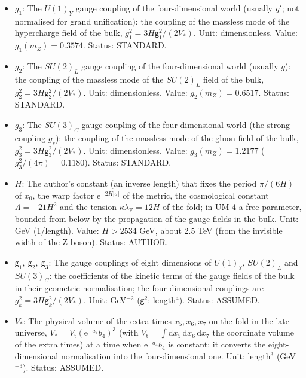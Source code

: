 \documentclass[
  10pt,
]{article}
\providecommand{\tightlist}{%
  \setlength{\itemsep}{0pt}\setlength{\parskip}{0pt}}
\begin{document}
\begin{itemize}
\tightlist
\item
  \(g_1\): The \(U(1)_Y\) gauge coupling of the four-dimensional world
  (usually \(g'\); not normalised for grand unification): the coupling
  of the massless mode of the hypercharge field of the bulk,
  \(g_1^2 = 3H\mathsf{g}_1^2/(2V_*)\). Unit: dimensionless. Value:
  \(g_1(m_Z) = 0.3574\). Status: STANDARD.
\item
  \(g_2\): The \(SU(2)_L\) gauge coupling of the four-dimensional world
  (usually \(g\)): the coupling of the massless mode of the \(SU(2)_L\)
  field of the bulk, \(g_2^2 = 3H\mathsf{g}_2^2/(2V_*)\). Unit:
  dimensionless. Value: \(g_2(m_Z) = 0.6517\). Status: STANDARD.
\item
  \(g_3\): The \(SU(3)_C\) gauge coupling of the four-dimensional world
  (the strong coupling \(g_s\)): the coupling of the massless mode of
  the gluon field of the bulk, \(g_3^2 = 3H\mathsf{g}_3^2/(2V_*)\).
  Unit: dimensionless. Value: \(g_3(m_Z) = 1.2177\)
  (\(g_3^2/(4\pi) = 0.1180\)). Status: STANDARD.
\item
  \(H\): The author's constant (an inverse length) that fixes the period
  \(\pi/(6H)\) of \(x_0\), the warp factor
  \(\mathrm{e}^{-2H\lvert\sigma\rvert}\) of the metric, the cosmological
  constant \(\Lambda = -21H^2\) and the tension
  \(\kappa\lambda_{\mathrm{F}} = 12H\) of the fold; in UM-4 a free
  parameter, bounded from below by the propagation of the gauge fields
  in the bulk. Unit: GeV (1/length). Value: \(H > 2534\) GeV, about 2.5
  TeV (from the invisible width of the Z boson). Status: AUTHOR.
\item
  \(\mathsf{g}_1,\ \mathsf{g}_2,\ \mathsf{g}_3\): The gauge couplings of
  eight dimensions of \(U(1)_Y\), \(SU(2)_L\) and \(SU(3)_C\): the
  coefficients of the kinetic terms of the gauge fields of the bulk in
  their geometric normalisation; the four-dimensional couplings are
  \(g_k^2 = 3H\mathsf{g}_k^2/(2V_*)\). Unit: GeV\(^{-2}\)
  (\(\mathsf{g}^2\): length\(^4\)). Status: ASSUMED.
\item
  \(V_*\): The physical volume of the extra times \(x_5, x_6, x_7\) on
  the fold in the late universe,
  \(V_* = V_{\mathrm{t}}(\mathrm{e}^{-a_4}b_4)^3\) (with
  \(V_{\mathrm{t}} = \int\mathrm{d}x_5\,\mathrm{d}x_6\,\mathrm{d}x_7\)
  the coordinate volume of the extra times) at a time when
  \(\mathrm{e}^{-a_4}b_4\) is constant; it converts the
  eight-dimensional normalisation into the four-dimensional one. Unit:
  length\(^3\) (GeV\(^{-3}\)). Status: ASSUMED.

\end{itemize}
\end{document}
